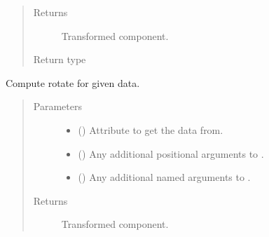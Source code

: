 \documentclass[letterpaper,10pt,english]{sphinxmanual}
\begin{document}
\begin{fulllineitems}
\begin{fulllineitems}
\begin{quote}
\begin{description}
\begin{itemize}
\end{itemize}

\item[{Returns}] \leavevmode
{} \textendash{} Transformed component.

\item[{Return type}] \leavevmode
{\hyperref[\detokenize{api/base_classes:geology.src.base_spatial.SpatialComponent}]{}}

\end{description}\end{quote}

\end{fulllineitems}


\begin{fulllineitems}
\label{\detokenize{api/states:geology.src.States.rotate}}
Compute rotate for given data.
\begin{quote}\begin{description}
\item[{Parameters}] \leavevmode\begin{itemize}
\item {} 
 (\sphinxstyleliteralemphasis{\sphinxupquote{, }}) \textendash{} Attribute to get the data from.

\item {} 
 () \textendash{} Any additional positional arguments to .

\item {} 
 () \textendash{} Any additional named arguments to .

\end{itemize}

\item[{Returns}] \leavevmode
{} \textendash{} Transformed component.


\end{description}
\end{quote}
\end{fulllineitems}
\end{fulllineitems}
\end{document}
